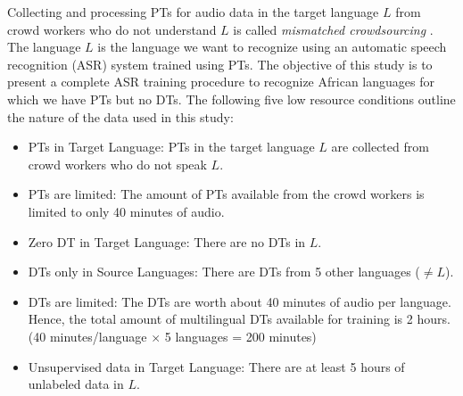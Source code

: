 \documentclass[a4paper]{article}
\begin{document}
Collecting and processing PTs for audio data in the target language $L$ from crowd workers who do not understand $L$ is called \emph{mismatched crowdsourcing} \cite{Jyothi-MismatchedCrowdsourcingTrans}. The language $L$ is the language we want to recognize using an automatic speech recognition (ASR) system trained using PTs. The objective of this study is to present a complete ASR training procedure to recognize African languages for which we have PTs but no DTs. 
 The following five low resource conditions outline the nature of the data used in this study:  %
\begin{itemize}[leftmargin=*]
\item PTs in Target Language: PTs in the target language $L$ are collected from crowd workers who do not speak $L$. \vspace{-2mm}
\item PTs are limited: The amount of PTs available from the crowd workers is limited to only 40 minutes of audio.  \vspace{-2mm}
\item Zero DT in Target Language: There are no DTs in $L$.  \vspace{-2mm}
\item DTs only in Source Languages: There are DTs from 5 other languages ($\ne L$).  \vspace{-2mm}
\item DTs are limited: The DTs are worth about 40 minutes of audio per language. Hence, the total amount of multilingual DTs available for training is 2 hours. (40 minutes/language $\times$ 5 languages = 200 minutes)  \vspace{-1mm}
\item Unsupervised data in Target Language: There are at least 5 hours of unlabeled data in $L$.  \vspace{-1mm}
\end{itemize}
\end{document}
